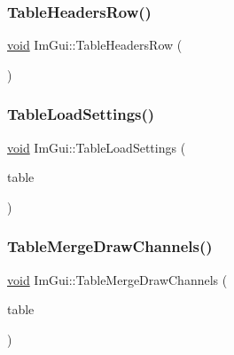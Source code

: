 \subsubsection{\texorpdfstring{Table\+Headers\+Row()}{TableHeadersRow()}}
{\footnotesize\ttfamily \hyperlink{imgui__impl__opengl3__loader_8h_ac668e7cffd9e2e9cfee428b9b2f34fa7}{void} Im\+Gui\+::\+Table\+Headers\+Row (\begin{DoxyParamCaption}{ }\end{DoxyParamCaption})}

\mbox{\label{namespaceImGui_a9dbe18a196cc7e70f84cecfcb3b45c1b}} 
\subsubsection{\texorpdfstring{Table\+Load\+Settings()}{TableLoadSettings()}}
{\footnotesize\ttfamily \hyperlink{imgui__impl__opengl3__loader_8h_ac668e7cffd9e2e9cfee428b9b2f34fa7}{void} Im\+Gui\+::\+Table\+Load\+Settings (\begin{DoxyParamCaption}\item[{\hyperlink{structImGuiTable}{Im\+Gui\+Table} $\ast$}]{table }\end{DoxyParamCaption})}

\mbox{\label{namespaceImGui_a0bf2259f81cd376b6790fe13dea70a22}} 
\subsubsection{\texorpdfstring{Table\+Merge\+Draw\+Channels()}{TableMergeDrawChannels()}}
{\footnotesize\ttfamily \hyperlink{imgui__impl__opengl3__loader_8h_ac668e7cffd9e2e9cfee428b9b2f34fa7}{void} Im\+Gui\+::\+Table\+Merge\+Draw\+Channels (\begin{DoxyParamCaption}\item[{\hyperlink{structImGuiTable}{Im\+Gui\+Table} $\ast$}]{table }\end{DoxyParamCaption})}

\mbox{\label{namespaceImGui_ac9925e8335f55449b1be988829e37ba5}} 
